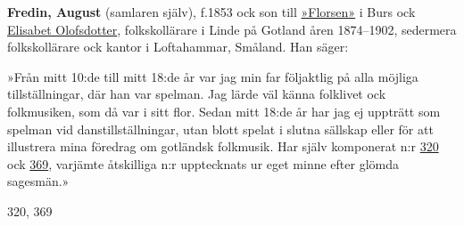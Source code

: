 \textbf{Fredin, August} (samlaren själv), f.\@ 1853 ock son till \href{Florsen}{»Florsen»}
i Burs ock \href{Olofsdotter}{Elisabet Olofsdotter}, folkskollärare i Linde på Gotland åren 1874--1902,
sedermera folkskollärare ock kantor i Loftahammar, Småland. Han säger:

»Från mitt 10:de till mitt 18:de år var jag min far följaktlig på alla möjliga tillställningar, där han var spelman. Jag lärde väl känna folklivet ock folkmusiken, som då var i sitt flor. Sedan mitt 18:de år har jag ej uppträtt som spelman vid danstillställningar, utan blott spelat i slutna sällskap eller för att illustrera mina föredrag om gotländsk folkmusik. Har själv komponerat n:r \href{320}{320} ock \href{369}{369}, varjämte åtskilliga n:r upptecknats ur eget minne efter glömda sagesmän.» 

320, 369